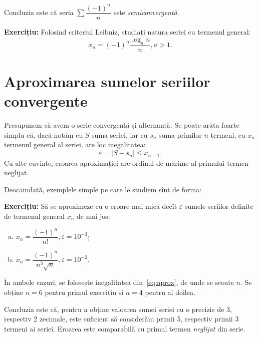 Concluzia este că seria $ \sum \dfrac{(-1)^n}{n} $ este \emph{semiconvergentă}.

\textbf{Exercițiu:} Folosind criteriul Leibniz, studiați natura seriei cu termenul general:
\[
    x_n = (-1)^n \dfrac{\log_a n}{n}, a > 1.
\]

\section{Aproximarea sumelor seriilor convergente}

Presupunem că avem o serie convergentă și alternantă. Se poate arăta foarte
simplu că, dacă notăm cu $ S $ suma seriei, iar cu $ s_n $ suma primilor $ n $
termeni, cu $ x_n $ termenul general al seriei, are loc inegalitatea:
\begin{equation}\label{eq:aprox}
    \varepsilon = | S - s_n | \leq x_{n + 1}.
\end{equation}
Cu alte cuvinte, eroarea aproximației are ordinul de mărime al primului
termen neglijat.

Deocamdată, exemplele simple pe care le studiem sînt de forma:

\textbf{Exercițiu:} Să se aproximeze cu o eroare mai mică decît $ \varepsilon $
sumele seriilor definite de termenul general $ x_n $ de mai jos:
\begin{enumerate}[(a)]
    \item $ x_n = \dfrac{(-1)^n}{n!}, \varepsilon = 10^{-3} $;
    \item $ x_n = \dfrac{(-1)^n}{n^3 \sqrt{n}}, \varepsilon = 10^{-2} $.
\end{enumerate}

În ambele cazuri, se folosește inegalitatea din~\eqref{eq:aprox}, de unde se 
scoate $ n $. Se obține $ n = 6 $ pentru primul exercițiu și $ n = 4 $ pentru
al doilea.

Concluzia este că, pentru a obține valoarea sumei seriei cu o precizie de 3, respectiv
2 zecimale, este suficient să considerăm primii 5, respectiv primii 3 termeni ai seriei. 
Eroarea este comparabilă cu primul termen \emph{neglijat} din serie.

